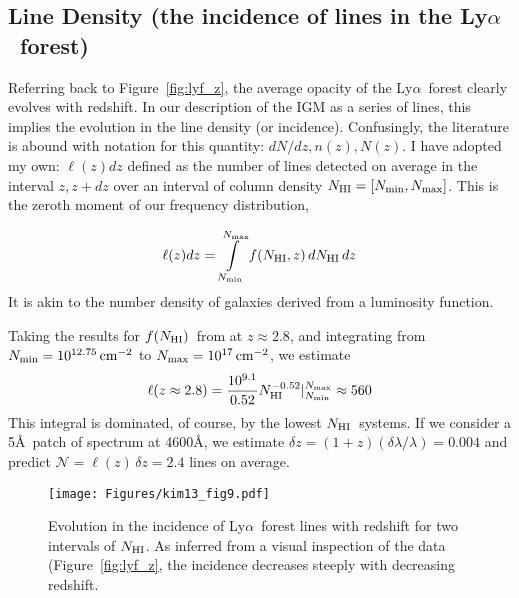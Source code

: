 \documentclass[graybox]{svmult}
\def\lya{Ly$\alpha$}
\def\intl{\int\limits}
\newcommand{\mnhi}{N_{\rm HI}}
\newcommand{\nhi}{$\mnhi$}
\def\cm#1{\, {\rm cm^{#1}}}
\def\mfnhi{f(\mnhi)}
\def\fnhi{$\mfnhi$}
\begin{document}
\subsection{Line Density (the incidence of lines in the \lya\ forest)}
Referring back to Figure~\ref{fig:lyf_z}, the average 
opacity of the \lya\ forest clearly evolves with redshift.
In our description of the IGM as a series of lines, this
implies the evolution in the line density (or incidence).
Confusingly, the literature is abound with notation for
this quantity: $dN/dz, n(z), N(z)$.
I have adopted my own:  $\ell(z) dz $ defined as the
number of lines detected on average in the interval 
$z, z+dz$ over an interval of 
column density $\mnhi = [N_{\rm min}, N_{\rm max}]$.
This is the zeroth moment of our frequency distribution,

\begin{equation}
\ell(z) dz = \intl_{N_{\rm min}}^{N_{\rm max}} f(\mnhi,z) \, d\mnhi \, dz
\label{eqn:loz}
\end{equation}
It is akin to the number density of galaxies derived from a 
luminosity function.

Taking the results for \fnhi\ from \cite{kim13} at $z \approx 2.8$,
and integrating from $N_{\rm min} = 10^{12.75} \cm{-2}$
to $N_{\rm max} = 10^{17} \cm{-2}$, we estimate
\begin{equation}
\ell(z \approx 2.8) = \frac{10^{9.1}}{0.52} \mnhi^{-0.52} 
|_{N_{\rm min}}^{N_{\rm max}} \approx 560
\end{equation}
This integral is dominated, of course, by the lowest 
\nhi\ systems.  If we consider a 5\AA\ patch of spectrum at 4600\AA,
we estimate $\delta z = (1+z) (\delta\lambda/\lambda) = 0.004$
and predict $\mathcal{N} = \ell(z) \, \delta z = 2.4$ lines
on average.

%
\begin{figure}[b]
\sidecaption
\texttt{[image: Figures/kim13\_fig9.pdf]}
%
%
\caption{Evolution in the incidence of \lya\ forest lines
with redshift for two intervals of \nhi.  As inferred from a visual
inspection of the data (Figure~\ref{fig:lyf_z}, 
the incidence decreases steeply with decreasing redshift.
}
\label{fig:kim13_loz}       %
\end{figure}
\end{document}
